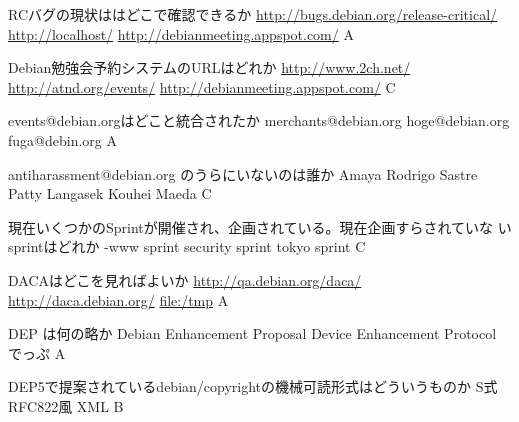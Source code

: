 %

\santaku
{RCバグの現状ははどこで確認できるか}
{\url{http://bugs.debian.org/release-critical/}}
{\url{http://localhost/}}
{\url{http://debianmeeting.appspot.com/}}
{A}
{}

\santaku
{Debian勉強会予約システムのURLはどれか}
{\url{http://www.2ch.net/}}
{\url{http://atnd.org/events/}}
{\url{http://debianmeeting.appspot.com/}}
{C}
{}

\santaku
{events@debian.orgはどこと統合されたか}
{merchants@debian.org}
{hoge@debian.org}
{fuga@debin.org}
{A}
{}

\santaku
{antiharassment@debian.org のうらにいないのは誰か}
{Amaya Rodrigo Sastre}
{Patty Langasek}
{Kouhei Maeda}
{C}
{}

\santaku
{現在いくつかのSprintが開催され、企画されている。現在企画すらされていな
いsprintはどれか}
{-www sprint}
{security sprint}
{tokyo sprint}
{C}
{}

\santaku
{DACAはどこを見ればよいか}
{\url{http://qa.debian.org/daca/}}
{\url{http://daca.debian.org/}}
{\url{file:/tmp}}
{A}
{}

\santaku
{DEP は何の略か}
{Debian Enhancement Proposal}
{Device Enhancement Protocol}
{でっぷ}
{A}
{}

\santaku
{DEP5で提案されているdebian/copyrightの機械可読形式はどういうものか}
{S式}
{RFC822風}
{XML}
{B}
{}

